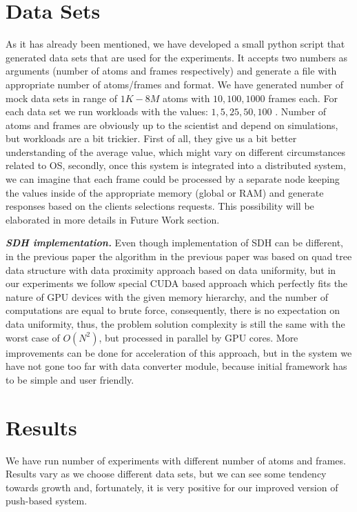 \documentclass[11pt,a4paper]{report}
\begin{document}
\section{Data Sets}

As it has already been mentioned, we have developed a small python script that generated data sets that are used for the experiments. It accepts two numbers as arguments (number of atoms and frames respectively) and generate a file with appropriate number of atoms/frames and format. We have generated number of mock data sets in range of $1K-8M$ atoms with $10, 100, 1000$ frames each. For each data set we run workloads with the values: $1, 5, 25, 50, 100$ . Number of atoms and frames are obviously up to the scientist and depend on simulations, but workloads are a bit trickier. First of all, they give us a bit better understanding of the average value, which might vary on different circumstances related to OS, secondly, once this system is integrated into a distributed system, we can imagine that each frame could be processed by a separate node keeping the values inside of the appropriate memory (global or RAM) and generate responses based on the clients selections requests. This possibility will be elaborated in more details in Future Work section.



\emph{\textbf{SDH implementation.}} Even though implementation of SDH can be different, in the previous paper the algorithm in the previous paper was based on quad tree data structure with data proximity approach based on data uniformity\cite{mainPaper}, but in our experiments we follow special CUDA based approach which perfectly fits the nature of GPU devices with the given memory hierarchy, and the number of computations are equal to brute force, consequently, there is no expectation on data uniformity, thus, the problem solution complexity is still the same with the worst case of $O(N^2)$, but processed in parallel by GPU cores. More improvements can be done for acceleration of this approach, but in the system we have not gone too far with data converter module, because initial framework has to be simple and user friendly.

\section{Results}

We have run number of experiments with different number of atoms and frames. Results vary as we choose different data sets, but we can see some tendency towards growth and, fortunately, it is very positive for our improved version of push-based system.
\end{document}
